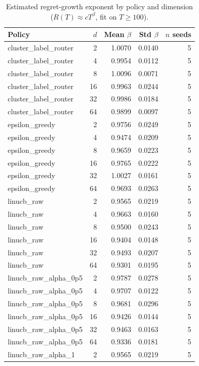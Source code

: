 \begin{table}[t]
\centering
\caption{Estimated regret-growth exponent by policy and dimension ($R(T)\approx cT^{\beta}$, fit on $T\geq100$).}
\label{tab:regret-beta-summary}
\begin{tabular}{lrrrr}
\toprule
Policy & $d$ & Mean $\beta$ & Std $\beta$ & $n$ seeds \\
\midrule
cluster\_label\_router & 2 & 1.0070 & 0.0140 & 5 \\
cluster\_label\_router & 4 & 0.9954 & 0.0112 & 5 \\
cluster\_label\_router & 8 & 1.0096 & 0.0071 & 5 \\
cluster\_label\_router & 16 & 0.9963 & 0.0244 & 5 \\
cluster\_label\_router & 32 & 0.9986 & 0.0184 & 5 \\
cluster\_label\_router & 64 & 0.9899 & 0.0097 & 5 \\
epsilon\_greedy & 2 & 0.9756 & 0.0249 & 5 \\
epsilon\_greedy & 4 & 0.9474 & 0.0209 & 5 \\
epsilon\_greedy & 8 & 0.9659 & 0.0223 & 5 \\
epsilon\_greedy & 16 & 0.9765 & 0.0222 & 5 \\
epsilon\_greedy & 32 & 1.0027 & 0.0161 & 5 \\
epsilon\_greedy & 64 & 0.9693 & 0.0263 & 5 \\
linucb\_raw & 2 & 0.9565 & 0.0219 & 5 \\
linucb\_raw & 4 & 0.9663 & 0.0160 & 5 \\
linucb\_raw & 8 & 0.9500 & 0.0243 & 5 \\
linucb\_raw & 16 & 0.9404 & 0.0148 & 5 \\
linucb\_raw & 32 & 0.9493 & 0.0207 & 5 \\
linucb\_raw & 64 & 0.9301 & 0.0195 & 5 \\
linucb\_raw\_alpha\_0p5 & 2 & 0.9787 & 0.0278 & 5 \\
linucb\_raw\_alpha\_0p5 & 4 & 0.9707 & 0.0122 & 5 \\
linucb\_raw\_alpha\_0p5 & 8 & 0.9681 & 0.0296 & 5 \\
linucb\_raw\_alpha\_0p5 & 16 & 0.9426 & 0.0144 & 5 \\
linucb\_raw\_alpha\_0p5 & 32 & 0.9463 & 0.0163 & 5 \\
linucb\_raw\_alpha\_0p5 & 64 & 0.9336 & 0.0181 & 5 \\
linucb\_raw\_alpha\_1 & 2 & 0.9565 & 0.0219 & 5 \\

\end{tabular}
\end{table}
